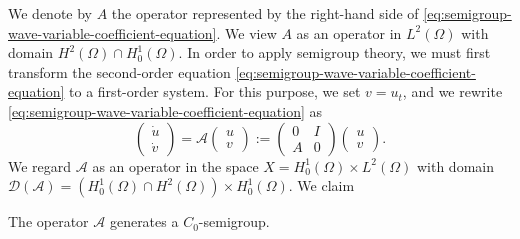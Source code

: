 We denote by $A$ the operator represented by the right-hand side of \eqref{eq:semigroup-wave-variable-coefficient-equation}. We view $A$ as an operator in $L^2(\Omega)$ with domain $H^2(\Omega)\cap H_0^1(\Omega)$. In order to apply semigroup theory, we must first transform the second-order equation \eqref{eq:semigroup-wave-variable-coefficient-equation} to a first-order system. For this purpose, we set $v=u_t$, and we rewrite \eqref{eq:semigroup-wave-variable-coefficient-equation} as
\begin{equation}\label{eq:semigroup-wave-first-order-operator-matrix}
\begin{pmatrix}\dot u\\\dot v\end{pmatrix}=\mathcal{A}\begin{pmatrix}u\\v\end{pmatrix}:=\begin{pmatrix}0&I\\A&0\end{pmatrix}\begin{pmatrix}u\\v\end{pmatrix}.
\end{equation}
We regard $\mathcal{A}$ as an operator in the space $X=H_0^1(\Omega)\times L^2(\Omega)$ with domain $\mathcal{D}(\mathcal{A})=(H_0^1(\Omega)\cap H^2(\Omega))\times H_0^1(\Omega)$. We claim

\begin{Theorem}
\label{thm:semigroup-wave-generation}
The operator $\mathcal{A}$ generates a $C_0$-semigroup.
\end{Theorem}


